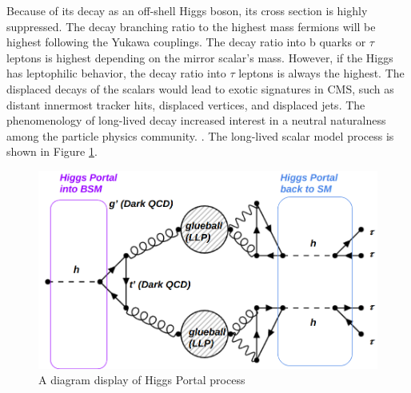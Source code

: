 Because of its decay as an off-shell Higgs boson, its cross section is highly suppressed.
The decay branching ratio to the highest mass fermions will be highest following the Yukawa couplings.
The decay ratio into b quarks or $\tau$ leptons is highest depending on the mirror scalar's mass.
However, if the Higgs has leptophilic behavior, the decay ratio into $\tau$ leptons is always the highest.
The displaced decays of the scalars would lead to exotic signatures in CMS, such as distant innermost tracker hits, displaced vertices, and displaced jets.
The phenomenology of long-lived decay increased interest in a neutral naturalness among the particle physics community. \cite{Curtin:2015fna,Csaki:2015fba}.
The long-lived scalar model process is shown in Figure \ref{fig:HiggsPortal}.



\begin{figure}[h!]
  \caption{A diagram display of Higgs Portal process}
  \label{fig:HiggsPortal}
  \centering
  \includegraphics[width=0.87\linewidth]{figs/TwinHiggs.png}
\end{figure}
